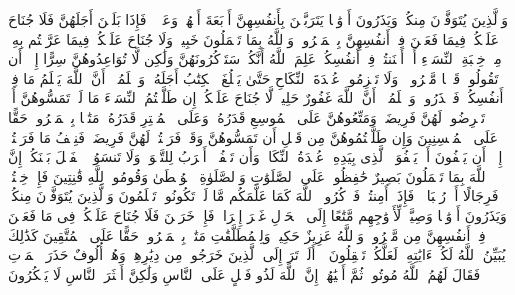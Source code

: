 \stopbuffer%
\startbuffer[\q:2:234]
وَٱلَّذِینَ یُتَوَفَّوۡنَ مِنكُمۡ وَیَذَرُونَ أَزۡوَٰجࣰا یَتَرَبَّصۡنَ بِأَنفُسِهِنَّ أَرۡبَعَةَ أَشۡهُرࣲ وَعَشۡرࣰاۖ فَإِذَا بَلَغۡنَ أَجَلَهُنَّ فَلَا جُنَاحَ عَلَیۡكُمۡ فِیمَا فَعَلۡنَ فِیۤ أَنفُسِهِنَّ بِٱلۡمَعۡرُوفِۗ وَٱللَّهُ بِمَا تَعۡمَلُونَ خَبِیرࣱ%
\stopbuffer%
\startbuffer[\q:2:235]
وَلَا جُنَاحَ عَلَیۡكُمۡ فِیمَا عَرَّضۡتُم بِهِۦ مِنۡ خِطۡبَةِ ٱلنِّسَاۤءِ أَوۡ أَكۡنَنتُمۡ فِیۤ أَنفُسِكُمۡۚ عَلِمَ ٱللَّهُ أَنَّكُمۡ سَتَذۡكُرُونَهُنَّ وَلَٰكِن لَّا تُوَاعِدُوهُنَّ سِرًّا إِلَّاۤ أَن تَقُولُوا۟ قَوۡلࣰا مَّعۡرُوفࣰاۚ وَلَا تَعۡزِمُوا۟ عُقۡدَةَ ٱلنِّكَاحِ حَتَّىٰ یَبۡلُغَ ٱلۡكِتَٰبُ أَجَلَهُۥۚ وَٱعۡلَمُوۤا۟ أَنَّ ٱللَّهَ یَعۡلَمُ مَا فِیۤ أَنفُسِكُمۡ فَٱحۡذَرُوهُۚ وَٱعۡلَمُوۤا۟ أَنَّ ٱللَّهَ غَفُورٌ حَلِیمࣱ%
\stopbuffer%
\startbuffer[\q:2:236]
لَّا جُنَاحَ عَلَیۡكُمۡ إِن طَلَّقۡتُمُ ٱلنِّسَاۤءَ مَا لَمۡ تَمَسُّوهُنَّ أَوۡ تَفۡرِضُوا۟ لَهُنَّ فَرِیضَةࣰۚ وَمَتِّعُوهُنَّ عَلَى ٱلۡمُوسِعِ قَدَرُهُۥ وَعَلَى ٱلۡمُقۡتِرِ قَدَرُهُۥ مَتَٰعَۢا بِٱلۡمَعۡرُوفِۖ حَقًّا عَلَى ٱلۡمُحۡسِنِینَ%
\stopbuffer%
\startbuffer[\q:2:237]
وَإِن طَلَّقۡتُمُوهُنَّ مِن قَبۡلِ أَن تَمَسُّوهُنَّ وَقَدۡ فَرَضۡتُمۡ لَهُنَّ فَرِیضَةࣰ فَنِصۡفُ مَا فَرَضۡتُمۡ إِلَّاۤ أَن یَعۡفُونَ أَوۡ یَعۡفُوَا۟ ٱلَّذِی بِیَدِهِۦ عُقۡدَةُ ٱلنِّكَاحِۚ وَأَن تَعۡفُوۤا۟ أَقۡرَبُ لِلتَّقۡوَىٰۚ وَلَا تَنسَوُا۟ ٱلۡفَضۡلَ بَیۡنَكُمۡۚ إِنَّ ٱللَّهَ بِمَا تَعۡمَلُونَ بَصِیرٌ%
\stopbuffer%
\startbuffer[\q:2:238]
حَٰفِظُوا۟ عَلَى ٱلصَّلَوَٰتِ وَٱلصَّلَوٰةِ ٱلۡوُسۡطَىٰ وَقُومُوا۟ لِلَّهِ قَٰنِتِینَ%
\stopbuffer%
\startbuffer[\q:2:239]
فَإِنۡ خِفۡتُمۡ فَرِجَالًا أَوۡ رُكۡبَانࣰاۖ فَإِذَاۤ أَمِنتُمۡ فَٱذۡكُرُوا۟ ٱللَّهَ كَمَا عَلَّمَكُم مَّا لَمۡ تَكُونُوا۟ تَعۡلَمُونَ%
\stopbuffer%
\startbuffer[\q:2:240]
وَٱلَّذِینَ یُتَوَفَّوۡنَ مِنكُمۡ وَیَذَرُونَ أَزۡوَٰجࣰا وَصِیَّةࣰ لِّأَزۡوَٰجِهِم مَّتَٰعًا إِلَى ٱلۡحَوۡلِ غَیۡرَ إِخۡرَاجࣲۚ فَإِنۡ خَرَجۡنَ فَلَا جُنَاحَ عَلَیۡكُمۡ فِی مَا فَعَلۡنَ فِیۤ أَنفُسِهِنَّ مِن مَّعۡرُوفࣲۗ وَٱللَّهُ عَزِیزٌ حَكِیمࣱ%
\stopbuffer%
\startbuffer[\q:2:241]
وَلِلۡمُطَلَّقَٰتِ مَتَٰعُۢ بِٱلۡمَعۡرُوفِۖ حَقًّا عَلَى ٱلۡمُتَّقِینَ%
\stopbuffer%
\startbuffer[\q:2:242]
كَذَٰلِكَ یُبَیِّنُ ٱللَّهُ لَكُمۡ ءَایَٰتِهِۦ لَعَلَّكُمۡ تَعۡقِلُونَ%
\stopbuffer%
\startbuffer[\q:2:243]
۞ أَلَمۡ تَرَ إِلَى ٱلَّذِینَ خَرَجُوا۟ مِن دِیَٰرِهِمۡ وَهُمۡ أُلُوفٌ حَذَرَ ٱلۡمَوۡتِ فَقَالَ لَهُمُ ٱللَّهُ مُوتُوا۟ ثُمَّ أَحۡیَٰهُمۡۚ إِنَّ ٱللَّهَ لَذُو فَضۡلٍ عَلَى ٱلنَّاسِ وَلَٰكِنَّ أَكۡثَرَ ٱلنَّاسِ لَا یَشۡكُرُونَ%
\stopbuffer%
